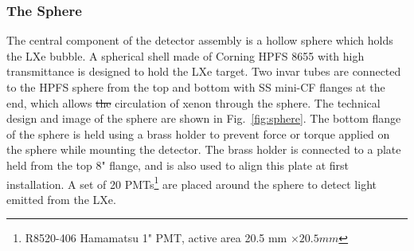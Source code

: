 \subsubsection{The Sphere}
\label{subsubsec:sphere}

The central component of the detector assembly is a hollow sphere 
which holds the LXe bubble. A spherical shell made of Corning HPFS 8655 with high transmittance is 
designed to hold the LXe target. Two invar tubes 
are connected to the HPFS sphere from the top and bottom with 
SS mini-CF flanges at the end, which allows \sout{the} circulation of xenon through 
the sphere. The technical design and image of the sphere are shown in Fig.~\ref{fig:sphere}. 
The bottom flange of the sphere is held using a brass holder to prevent 
force or torque applied on the sphere while mounting the detector. The 
brass holder is connected to a plate held from the top 8" flange, and is 
also used to align this plate at first installation. A set of 20 
PMTs\footnote{R8520-406 Hamamatsu 1" PMT, active area 20.5 mm $\times 20.5 mm$} 
are placed around the sphere to detect light emitted from the LXe.


